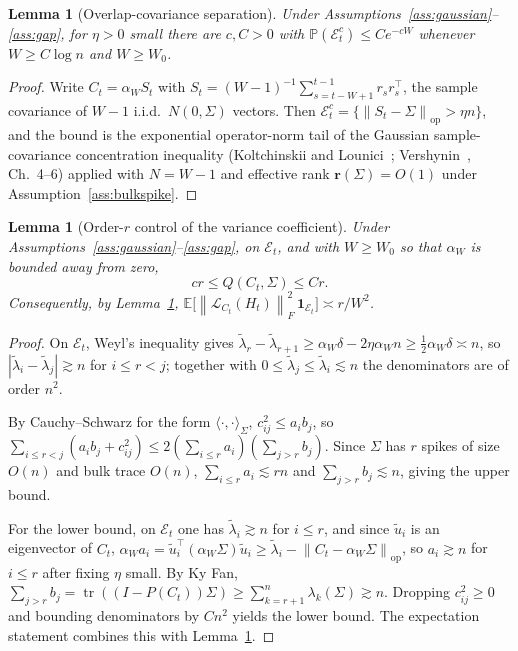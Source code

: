 \documentclass[11pt]{article}
\theoremstyle{tightplain}
\newtheorem{lemma}[theorem]{Lemma}
\theoremstyle{tightdef}
\DeclareMathOperator{\tr}{tr}
\DeclareMathOperator{\op}{op}
\newcommand{\E}{\mathbb E}
\newcommand{\Prob}{\mathbb P}
\newcommand{\norm}[1]{\left\lVert #1 \right\rVert}
\newcommand{\abs}[1]{\left\lvert #1 \right\rvert}
\newcommand{\one}{\mathbf 1}
\newcommand{\Ecal}{\mathcal E}
\begin{document}
\begin{lemma}[Overlap-covariance separation]\label{inp:coresep}
Under Assumptions~\ref{ass:gaussian}--\ref{ass:gap}, for $\eta>0$ small there are
$c,C>0$ with $\Prob(\Ecal_t^c)\le Ce^{-cW}$ whenever $W\ge C\log n$ and $W\ge W_0$.
\end{lemma}

\begin{proof}
Write $C_t=\alpha_W S_t$ with $S_t=(W-1)^{-1}\sum_{s=t-W+1}^{t-1}r_s r_s^\top$, the
sample covariance of $W-1$ i.i.d.\ $N(0,\Sigma)$ vectors. Then
$\Ecal_t^c=\{\norm{S_t-\Sigma}_{\op}>\eta n\}$, and the bound is the exponential
operator-norm tail of the Gaussian sample-covariance concentration inequality
(Koltchinskii and Lounici~\cite{kl}; Vershynin~\cite{vershynin}, Ch.~4--6) applied
with $N=W-1$ and effective rank $\mathbf r(\Sigma)=O(1)$ under
Assumption~\ref{ass:bulkspike}.
\end{proof}

\begin{lemma}[Order-$r$ control of the variance coefficient]\label{lem:sharedcorelinearized}
Under Assumptions~\ref{ass:gaussian}--\ref{ass:gap}, on $\Ecal_t$, and with $W\ge W_0$
so that $\alpha_W$ is bounded away from zero,
\[
c r\le Q(C_t,\Sigma)\le C r .
\]
Consequently, by Lemma~\ref{inp:coresep},
$\E\bigl[\norm{\mathcal L_{C_t}(H_t)}_F^2\,\one_{\Ecal_t}\bigr]\asymp r/W^2$.
\end{lemma}

\begin{proof}
On $\Ecal_t$, Weyl's inequality gives
$\widetilde\lambda_r-\widetilde\lambda_{r+1}\ge\alpha_W\delta-2\eta\alpha_W n
\ge\tfrac12\alpha_W\delta\asymp n$, so $\abs{\widetilde\lambda_i-\widetilde\lambda_j}\gtrsim n$
for $i\le r<j$; together with $0\le\widetilde\lambda_j\le\widetilde\lambda_i\lesssim n$
the denominators are of order $n^2$.

By Cauchy--Schwarz for the form $\langle\cdot,\cdot\rangle_\Sigma$, $c_{ij}^2\le a_i b_j$,
so $\sum_{i\le r<j}(a_i b_j+c_{ij}^2)\le 2(\sum_{i\le r}a_i)(\sum_{j>r}b_j)$. Since
$\Sigma$ has $r$ spikes of size $O(n)$ and bulk trace $O(n)$,
$\sum_{i\le r}a_i\lesssim rn$ and $\sum_{j>r}b_j\lesssim n$, giving the upper bound.

For the lower bound, on $\Ecal_t$ one has $\widetilde\lambda_i\gtrsim n$ for $i\le r$, and
since $\widetilde u_i$ is an eigenvector of $C_t$,
$\alpha_W a_i=\widetilde u_i^\top(\alpha_W\Sigma)\widetilde u_i
\ge\widetilde\lambda_i-\norm{C_t-\alpha_W\Sigma}_{\op}$, so $a_i\gtrsim n$ for $i\le r$
after fixing $\eta$ small. By Ky Fan,
$\sum_{j>r}b_j=\tr((I-P(C_t))\Sigma)\ge\sum_{k=r+1}^n\lambda_k(\Sigma)\gtrsim n$.
Dropping $c_{ij}^2\ge0$ and bounding denominators by $Cn^2$ yields the lower bound.
The expectation statement combines this with Lemma~\ref{inp:coresep}.
\end{proof}
\end{document}
